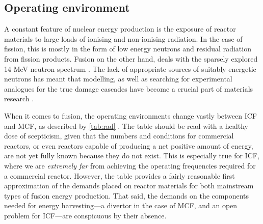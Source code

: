 \subsection{Operating environment}
\label{ss:operating_env}

A constant feature of nuclear energy production is the exposure of reactor materials to large loads of ionising and non-ionising radiation. In the case of fission, this is mostly in the form of low energy neutrons and residual radiation from fission products. Fusion on the other hand, deals with the sparsely explored 14 MeV neutron spectrum \cite{mats_fis_fus}. The lack of appropriate sources of suitably energetic neutrons \cite{ifmif} has meant that modelling, as well as searching for experimental analogues for the true damage cascades have become a crucial part of materials research \cite{fusmat1s}.

When it comes to fusion, the operating environments change vastly between ICF and MCF, as described by \cref{tab:rad} \cite{openv}. The table should be read with a healthy dose of scepticism, given that the numbers and conditions for commercial reactors, or even reactors capable of producing a net positive amount of energy, are not yet fully known because they do not exist. This is especially true for ICF, where we are \emph{extremely far} from achieving the operating frequencies required for a commercial reactor. However, the table provides a fairly reasonable first approximation of the demands placed on reactor materials for both mainstream types of fusion energy production. That said, the demands on the components needed for energy harvesting---a divertor in the case of MCF, and an open problem for ICF---are conspicuous by their absence.

